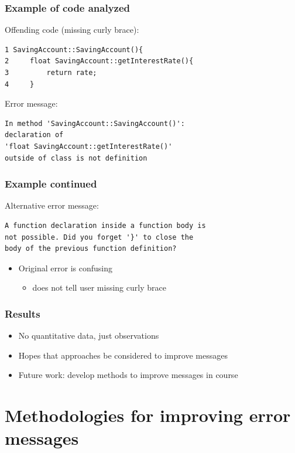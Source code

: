 \documentclass{beamer}
\begin{document}
\begin{frame}[fragile]
	\frametitle{Example of code analyzed}
Offending code (missing curly brace):
\begin{verbatim}
1 SavingAccount::SavingAccount(){
2     float SavingAccount::getInterestRate(){
3    	  return rate;
4     }
\end{verbatim}

Error message:
\begin{verbatim}
In method 'SavingAccount::SavingAccount()':
declaration of 
'float SavingAccount::getInterestRate()'
outside of class is not definition
\end{verbatim}

\end{frame}

\begin{frame}[fragile]
	\frametitle{Example continued}
Alternative error message:
\begin{verbatim}
A function declaration inside a function body is 
not possible. Did you forget '}' to close the 
body of the previous function definition?
\end{verbatim}

\begin{itemize}
	\item Original error is confusing
	\begin{itemize}
		\item does not tell user missing curly brace
	\end{itemize}
\end{itemize}

\end{frame}

\begin{frame}
	\frametitle{Results}
		\begin{itemize}
			\item No quantitative data, just observations
			\item Hopes that approaches be considered to improve messages
			\item Future work: develop methods to improve messages in course
		\end{itemize}

\end{frame}

\section[Methodologies]{Methodologies for improving error messages}
\end{document}
